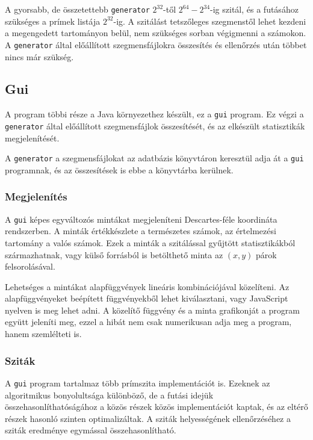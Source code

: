 A gyorsabb, de összetettebb \texttt{generator} $2^{32}$-től $2^{64}-2^{34}$-ig szitál,
és a futásához szükséges a prímek listája $2^{32}$-ig.
A szitálást tetszőleges szegmenstől lehet kezdeni a megengedett tartományon belül, nem szükséges sorban végigmenni a számokon.
A \texttt{generator} által előállított szegmensfájlokra összesítés és ellenőrzés után többet nincs már szükség.

\subsection{Gui}

A program többi része a Java környezethez készült, ez a \texttt{gui} program.
Ez végzi a \texttt{generator} által előállított szegmensfájlok összesítését, és az elkészült statisztikák megjelenítését.

A \texttt{generator} a szegmensfájlokat az adatbázis könyvtáron keresztül adja át a \texttt{gui} programnak, és az összesítések is ebbe a könyvtárba kerülnek.

\subsubsection{Megjelenítés}

A \texttt{gui} képes egyváltozós mintákat megjeleníteni Descartes-féle koordináta rendszerben.
A minták értékkészlete a természetes számok, az értelmezési tartomány a valós számok.
Ezek a minták a szitálással gyűjtött statisztikákból származhatnak, vagy külső forrásból is betölthető minta az $(x, y)$ párok felsorolásával.

Lehetséges a mintákat alapfüggvények lineáris kombinációjával közelíteni.
Az alapfüggvényeket beépített függvényekből lehet kiválasztani, vagy JavaScript nyelven is meg lehet adni.
A közelítő függvény és a minta grafikonját a program együtt jeleníti meg, ezzel a hibát nem csak numerikusan adja meg a program, hanem szemlélteti is.

\subsubsection{Sziták}

A \texttt{gui} program tartalmaz több prímszita implementációt is. Ezeknek az algoritmikus bonyolultsága különböző, de a futási idejük összehasonlíthatóságához a közös részek közös implementációt kaptak, és az eltérő részek hasonló szinten optimalizáltak.
A sziták helyességének ellenőrzéséhez a sziták eredménye egymással összehasonlítható.

